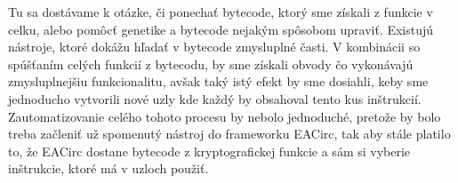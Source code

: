 Tu sa dostávame k otázke, či ponechať bytecode, ktorý sme získali z funkcie v celku, alebo pomôcť genetike a bytecode nejakým spôsobom upraviť. Existujú nástroje, ktoré dokážu hľadať v bytecode zmysluplné časti. V kombinácii so spúšťaním celých funkcií z bytecodu, by sme získali obvody čo vykonávajú zmysluplnejšiu funkcionalitu, avšak taký istý efekt by sme dosiahli, keby sme jednoducho vytvorili nové uzly kde každý by obsahoval tento kus inštrukcií. Zautomatizovanie celého tohoto procesu by nebolo jednoduché, pretože by bolo treba začleniť už spomenutý nástroj do frameworku EACirc, tak aby stále platilo to, že EACirc dostane bytecode z kryptografickej funkcie a sám si vyberie inštrukcie, ktoré má v uzloch použiť. 



 

